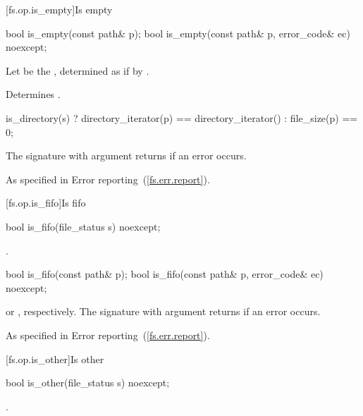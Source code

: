 [fs.op.is_empty]{Is empty}

\begin{itemdecl}
bool is_empty(const path& p);
bool is_empty(const path& p, error_code& ec) noexcept;
\end{itemdecl}

\begin{itemdescr}
\pnum
Let  be the , determined
as if by .

\pnum
\effects Determines .

\pnum
\returns
\begin{codeblock}
is_directory(s) ? directory_iterator(p) == directory_iterator() : file_size(p) == 0;
\end{codeblock}
The signature with argument  returns  if
  an error occurs.

\pnum
\throws As specified in Error reporting~(\ref{fs.err.report}).
\end{itemdescr}


[fs.op.is_fifo]{Is fifo}

\begin{itemdecl}
bool is_fifo(file_status s) noexcept;
\end{itemdecl}

\begin{itemdescr}
\pnum
\returns {}.
\end{itemdescr}


\begin{itemdecl}
bool is_fifo(const path& p);
bool is_fifo(const path& p, error_code& ec) noexcept;
\end{itemdecl}

\begin{itemdescr}
\pnum
\returns {} or , respectively.
The signature with argument  returns  if an error occurs.

\pnum
\throws As specified in Error reporting~(\ref{fs.err.report}).
\end{itemdescr}


[fs.op.is_other]{Is other}

\begin{itemdecl}
bool is_other(file_status s) noexcept;
\end{itemdecl}

\begin{itemdescr}
\pnum
\returns {}.
\end{itemdescr}

